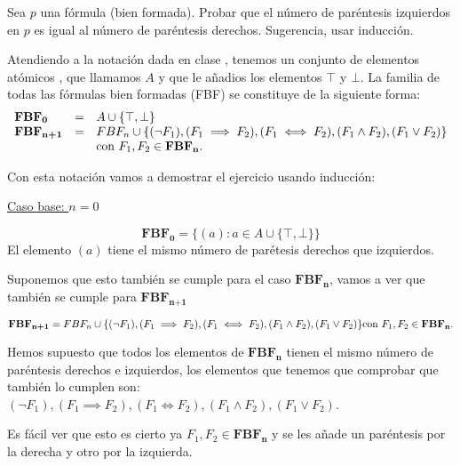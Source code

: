 	\begin{problem}
	 Sea $p$ una f\'ormula (bien formada). Probar que el n\'umero de par\'entesis izquierdos en
	$p$ es igual al  n\'umero de par\'entesis derechos. Sugerencia, usar inducci\'on. 
	\solution
	
	Atendiendo a la notación dada en clase , tenemos un conjunto de elementos atómicos , que llamamos $A$ y que le añadios los elementos $\top$ y $\bot$. La familia de todas las fórmulas bien formadas (FBF) se constituye de la siguiente forma:
\begin{equation*}
	\begin{array}{l l l}
		\textbf{FBF}_\textbf{0} &=& A\cup\{\top, \perp \}\\
		\textbf{FBF}_\textbf{n+1} &=& FBF_n \cup \{(\neg F_1), (F_1\implies F_2),(F_1\iff F_2),(F_1\wedge F_2),(F_1\vee F_2)\}\\ &&\text{con } F_1,F_2\in \textbf{FBF}_\textbf{n}.
	\end{array}
\end{equation*}

Con esta notación vamos a demostrar el ejercicio usando inducción:

\underline{Caso base: $n=0$}

$$\textbf{FBF}_\textbf{0} = \{(a) : a\in A \cup \{\top , \bot\}\}$$
El elemento $(a)$ tiene el mismo número de parétesis derechos que izquierdos.

Suponemos que esto también se cumple para el caso $\textbf{FBF}_\textbf{n}$, vamos a ver que también se cumple para $\textbf{FBF}_\textbf{n+1}$

$$\textbf{FBF}_\textbf{n+1} = FBF_n \cup \{(\neg F_1), (F_1\implies F_2),(F_1\iff F_2),(F_1\wedge F_2),(F_1\vee F_2)\}\\ \text{con } F_1,F_2\in \textbf{FBF}_\textbf{n}.$$

Hemos supuesto que todos los elementos de $\textbf{FBF}_\textbf{n}$ tienen el mismo número de paréntesis derechos e izquierdos, los elementos que tenemos que comprobar que también lo cumplen son:$(\neg F_1), (F_1\implies F_2),(F_1\iff F_2),(F_1\wedge F_2),(F_1\vee F_2)$.

Es fácil ver que esto es cierto ya $ F_1,F_2\in \textbf{FBF}_\textbf{n}$ y se les añade un paréntesis por la derecha y otro por la izquierda.
\end{problem}